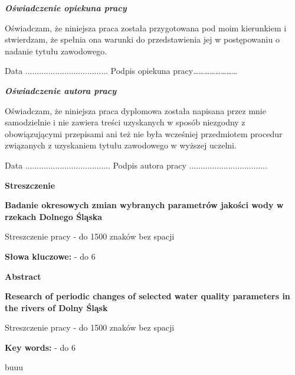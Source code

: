 \documentclass[12pt,a4paper]{article}
\begin{document}
{\fontsize{16}{16}\selectfont\textbf{\textit{Oświadczenie opiekuna pracy}}}

\vspace{12pt}

Oświadczam, że niniejsza praca została przygotowana pod moim kierunkiem i stwierdzam, że spełnia ona warunki do przedstawienia jej w postępowaniu o nadanie tytułu zawodowego.

\vspace{36pt}

Data .................................... \hspace{100pt} Podpis opiekuna pracy……………………

\vspace{100pt}


{\fontsize{16}{16}\selectfont\textbf{\textit{Oświadczenie autora pracy}}}

\vspace{12pt}

Oświadczam, że niniejsza praca dyplomowa została napisana przez mnie samodzielnie i nie zawiera treści uzyskanych w sposób niezgodny z obowiązującymi przepisami ani też nie była wcześniej przedmiotem procedur związanych z uzyskaniem tytułu zawodowego w wyższej uczelni.

\vspace{36pt}

Data ..................................... \hspace{100pt}	Podpis autora pracy ..................................

\clearpage
\thispagestyle{empty}
\begin{center}
\textbf{Streszczenie}

\vspace{24pt}

\textbf{Badanie okresowych zmian wybranych parametrów jakości wody w rzekach Dolnego Śląska}
\end{center}

\vspace{24pt}

Streszczenie pracy - do 1500 znaków bez spacji 

\vspace{72pt}

\textbf{Słowa kluczowe:} - do 6 


\clearpage
\thispagestyle{empty}
\begin{center}
\textbf{Abstract}

\vspace{24pt}

\textbf{Research of periodic changes of selected water quality parameters in the rivers of Dolny Śląsk}
\end{center}

\vspace{24pt}

Streszczenie pracy - do 1500 znaków bez spacji 

\vspace{72pt}

\textbf{Key words:} - do 6 

\clearpage
buuu
\setcounter{page}{5}
\end{document}
